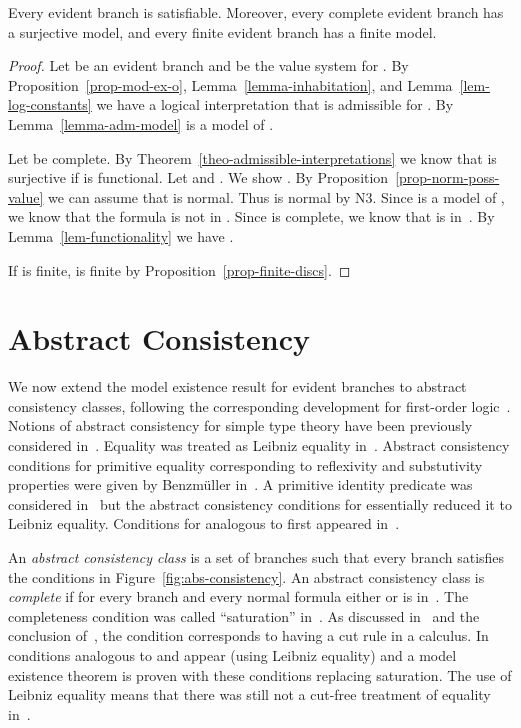 \begin{thm}
  \label{theo-model-exist}
  Every evident branch is satisfiable.  Moreover, every
  complete evident branch has a surjective model, and
  every finite evident branch has a finite model.
\end{thm}

\begin{proof}
  Let  be an evident branch and  be the
  value system for .  By
  Proposition~\ref{prop-mod-ex-o},
  Lemma~\ref{lemma-inhabitation}, and
  Lemma~\ref{lem-log-constants} we have a logical
  interpretation  that is admissible for
  .  By Lemma~\ref{lemma-adm-model}  is a
  model of .  

  Let  be complete.  By
  Theorem~\ref{theo-admissible-interpretations} we know
  that  is surjective if  is functional.
  Let  and .  We show
  .  By Proposition~\ref{prop-norm-poss-value} we
  can assume that  is normal.  Thus  is
  normal by N3. Since  is a model of , we know
  that the formula  is not in .  Since 
  is complete, we know that  is
  in~.  By Lemma~\ref{lem-functionality} we have
  .

  If  is finite,  is finite
  by Proposition~\ref{prop-finite-discs}.
\end{proof}

\section{Abstract Consistency}

We now extend the model existence result for evident
branches to abstract consistency classes, following the
corresponding development for first-order
logic~\cite{SmullyanBook}.
Notions of abstract consistency for simple type theory have
been previously considered in~\cite{Andrews71,Kohlhase93a,KohlhaseTableaux1995,Benzmuller99a,BenzKoh98,BBK04,BBKweb04,Brown2004a,BrownARHO}.
Equality was treated as Leibniz equality in~\cite{Andrews71}.
Abstract consistency conditions for
primitive equality corresponding to reflexivity and substutivity properties
were given by Benzm\"uller in~\cite{Benzmuller99a,Benzmuller99b}. 
A primitive identity predicate  was considered in~\cite{BBK04}
but the abstract consistency conditions for  essentially reduced it
to Leibniz equality.  
Conditions for  analogous to  first appeared in~\cite{Brown2004a}.

An \emph{abstract consistency class} is a set 
of branches such that every branch 
satisfies the conditions in
Figure~\ref{fig:abs-consistency}.  An abstract
consistency class  is \emph{complete} if for
every branch  and every normal formula 
either  or  is
in~.  
The completeness condition was called ``saturation'' in~\cite{BBK04}.
As discussed in~\cite{BBK2009} and the conclusion of~\cite{BBK04},
the condition corresponds to having a cut rule in a calculus.
In~\cite{BBKweb04} conditions analogous to  and  appear (using Leibniz equality)
and a model existence theorem is proven with these conditions replacing saturation.
The use of Leibniz equality means that there was still not a cut-free treatment of equality in~\cite{BBKweb04}.


